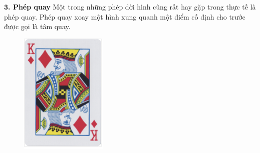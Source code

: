 \begin{multicols}{2}
\begin{figure}[H]
		\vspace*{-10pt}
	\end{figure}
	\textbf{\color{toancuabi}$\pmb3$. Phép quay}
	\vskip 0.1cm
	Một trong những phép dời hình cũng rất hay gặp trong thực tế là phép quay. Phép quay xoay một hình xung quanh một điểm cố định cho trước được gọi là tâm quay.
	\begin{figure}[H]
		\vspace*{-5pt}
		\centering
		\captionsetup{labelformat= empty, justification=centering}
		\includegraphics[width= 1\linewidth]{Picture13}

\end{figure}
\end{multicols}
